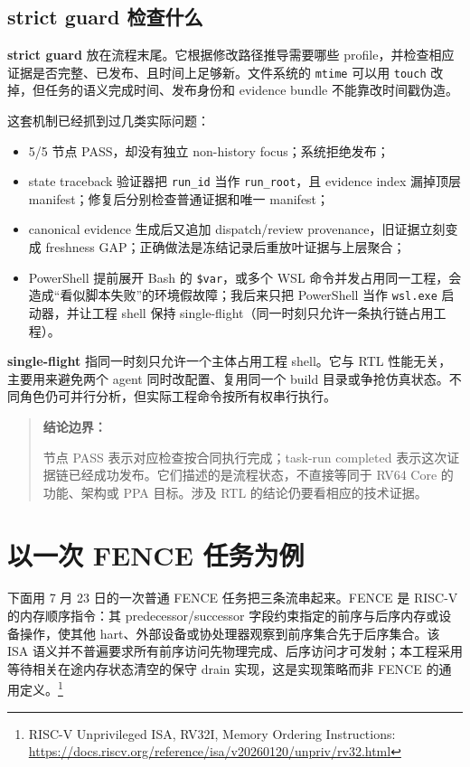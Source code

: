 \documentclass[UTF8,a4paper,zihao=-4,oneside]{ctexart}
\newenvironment{boundarynote}{%
  \begin{quote}\small\noindent\textbf{结论边界：}\ignorespaces
}{%
  \end{quote}
}
\begin{document}
\subsection{strict guard 检查什么}

\textbf{strict guard} 放在流程末尾。它根据修改路径推导需要哪些 profile，并检查相应证据是否完整、已发布、且时间上足够新。文件系统的 \texttt{mtime} 可以用 \texttt{touch} 改掉，但任务的语义完成时间、发布身份和 evidence bundle 不能靠改时间戳伪造。

这套机制已经抓到过几类实际问题：

\begin{itemize}
  \item 5/5 节点 PASS，却没有独立 non-history focus；系统拒绝发布；
  \item state traceback 验证器把 \texttt{run\_id} 当作 \texttt{run\_root}，且 evidence index 漏掉顶层 manifest；修复后分别检查普通证据和唯一 manifest；
  \item canonical evidence 生成后又追加 dispatch/review provenance，旧证据立刻变成 freshness GAP；正确做法是冻结记录后重放叶证据与上层聚合；
  \item PowerShell 提前展开 Bash 的 \texttt{\$var}，或多个 WSL 命令并发占用同一工程，会造成“看似脚本失败”的环境假故障；我后来只把 PowerShell 当作 \texttt{wsl.exe} 启动器，并让工程 shell 保持 single-flight（同一时刻只允许一条执行链占用工程）。
\end{itemize}

\textbf{single-flight} 指同一时刻只允许一个主体占用工程 shell。它与 RTL 性能无关，主要用来避免两个 agent 同时改配置、复用同一个 build 目录或争抢仿真状态。不同角色仍可并行分析，但实际工程命令按所有权串行执行。

\begin{boundarynote}
节点 PASS 表示对应检查按合同执行完成；task-run completed 表示这次证据链已经成功发布。它们描述的是流程状态，不直接等同于 RV64 Core 的功能、架构或 PPA 目标。涉及 RTL 的结论仍要看相应的技术证据。
\end{boundarynote}

\section{以一次 FENCE 任务为例}

下面用 7 月 23 日的一次普通 FENCE 任务把三条流串起来。FENCE 是 RISC-V 的内存顺序指令：其 predecessor/successor 字段约束指定的前序与后序内存或设备操作，使其他 hart、外部设备或协处理器观察到前序集合先于后序集合。该 ISA 语义并不普遍要求所有前序访问先物理完成、后序访问才可发射；本工程采用等待相关在途内存状态清空的保守 drain 实现，这是实现策略而非 FENCE 的通用定义。\footnote{RISC-V Unprivileged ISA, RV32I, Memory Ordering Instructions: \url{https://docs.riscv.org/reference/isa/v20260120/unpriv/rv32.html}}
\end{document}
